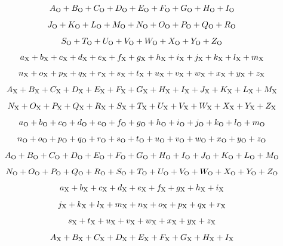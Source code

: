 $$
A_{\rm O}+
B_{\rm O}+
C_{\rm O}+
D_{\rm O}+
E_{\rm O}+
F_{\rm O}+
G_{\rm O}+
H_{\rm O}+
I_{\rm O}
$$

$$
J_{\rm O}+
K_{\rm O}+
L_{\rm O}+
M_{\rm O}+
N_{\rm O}+
O_{\rm O}+
P_{\rm O}+
Q_{\rm O}+
R_{\rm O}
$$

$$
S_{\rm O}+
T_{\rm O}+
U_{\rm O}+
V_{\rm O}+
W_{\rm O}+
X_{\rm O}+
Y_{\rm O}+
Z_{\rm O}
$$



$$
a_{\rm X}+
b_{\rm X}+
c_{\rm X}+
d_{\rm X}+
e_{\rm X}+
f_{\rm X}+
g_{\rm X}+
h_{\rm X}+
i_{\rm X}+
j_{\rm X}+
k_{\rm X}+
l_{\rm X}+
m_{\rm X}
$$

$$n_{\rm X}+
o_{\rm X}+
p_{\rm X}+
q_{\rm X}+
r_{\rm X}+
s_{\rm X}+
t_{\rm X}+
u_{\rm X}+
v_{\rm X}+
w_{\rm X}+
x_{\rm X}+
y_{\rm X}+
z_{\rm X}
$$

$$
A_{\rm X}+
B_{\rm X}+
C_{\rm X}+
D_{\rm X}+
E_{\rm X}+
F_{\rm X}+
G_{\rm X}+
H_{\rm X}+
I_{\rm X}+
J_{\rm X}+
K_{\rm X}+
L_{\rm X}+
M_{\rm X}
$$

$$
N_{\rm X}+
O_{\rm X}+
P_{\rm X}+
Q_{\rm X}+
R_{\rm X}+
S_{\rm X}+
T_{\rm X}+
U_{\rm X}+
V_{\rm X}+
W_{\rm X}+
X_{\rm X}+
Y_{\rm X}+
Z_{\rm X}
$$


$$
a_{\rm O}+
b_{\rm O}+
c_{\rm O}+
d_{\rm O}+
e_{\rm O}+
f_{\rm O}+
g_{\rm O}+
h_{\rm O}+
i_{\rm O}+
j_{\rm O}+
k_{\rm O}+
l_{\rm O}+
m_{\rm O}
$$

$$
n_{\rm O}+
o_{\rm O}+
p_{\rm O}+
q_{\rm O}+
r_{\rm O}+
s_{\rm O}+
t_{\rm O}+
u_{\rm O}+
v_{\rm O}+
w_{\rm O}+
x_{\rm O}+
y_{\rm O}+
z_{\rm O}
$$

$$
A_{\rm O}+
B_{\rm O}+
C_{\rm O}+
D_{\rm O}+
E_{\rm O}+
F_{\rm O}+
G_{\rm O}+
H_{\rm O}+
I_{\rm O}+
J_{\rm O}+
K_{\rm O}+
L_{\rm O}+
M_{\rm O}
$$

$$
N_{\rm O}+
O_{\rm O}+
P_{\rm O}+
Q_{\rm O}+
R_{\rm O}+
S_{\rm O}+
T_{\rm O}+
U_{\rm O}+
V_{\rm O}+
W_{\rm O}+
X_{\rm O}+
Y_{\rm O}+
Z_{\rm O}
$$



$$
a_{\rm X}+
b_{\rm X}+
c_{\rm X}+
d_{\rm X}+
e_{\rm X}+
f_{\rm X}+
g_{\rm X}+
h_{\rm X}+
i_{\rm X}
$$

$$
j_{\rm X}+
k_{\rm X}+
l_{\rm X}+
m_{\rm X}+
n_{\rm X}+
o_{\rm X}+
p_{\rm X}+
q_{\rm X}+
r_{\rm X}
$$

$$
s_{\rm X}+
t_{\rm X}+
u_{\rm X}+
v_{\rm X}+
w_{\rm X}+
x_{\rm X}+
y_{\rm X}+
z_{\rm X}
$$

$$
A_{\rm X}+
B_{\rm X}+
C_{\rm X}+
D_{\rm X}+
E_{\rm X}+
F_{\rm X}+
G_{\rm X}+
H_{\rm X}+
I_{\rm X}
$$

